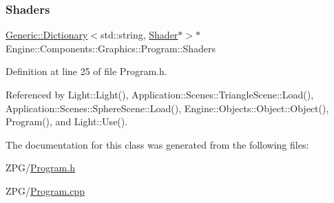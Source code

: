 \subsubsection{\texorpdfstring{Shaders}{Shaders}}
{\footnotesize\ttfamily \mbox{\hyperlink{classGeneric_1_1Dictionary}{Generic\+::\+Dictionary}}$<$std\+::string, \mbox{\hyperlink{classEngine_1_1Components_1_1Graphics_1_1Shader}{Shader}}$\ast$$>$$\ast$ Engine\+::\+Components\+::\+Graphics\+::\+Program\+::\+Shaders}



Definition at line 25 of file Program.\+h.



Referenced by Light\+::\+Light(), Application\+::\+Scenes\+::\+Triangle\+Scene\+::\+Load(), Application\+::\+Scenes\+::\+Sphere\+Scene\+::\+Load(), Engine\+::\+Objects\+::\+Object\+::\+Object(), Program(), and Light\+::\+Use().



The documentation for this class was generated from the following files\+:\begin{DoxyCompactItemize}
\item 
Z\+P\+G/\mbox{\hyperlink{Program_8h}{Program.\+h}}\item 
Z\+P\+G/\mbox{\hyperlink{Program_8cpp}{Program.\+cpp}}\end{DoxyCompactItemize}

